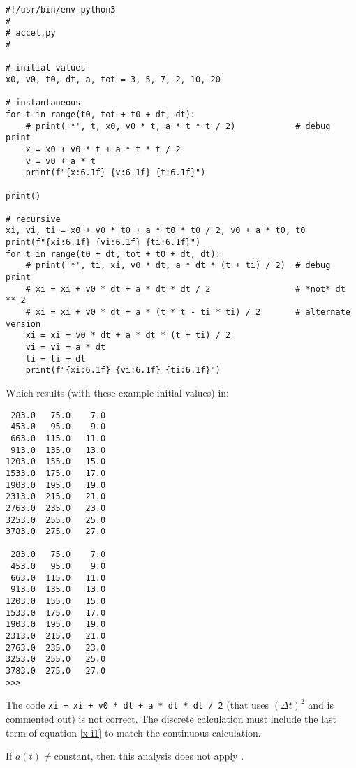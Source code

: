 \documentclass[10pt]{article}%
\begin{document}
\begin{multicols*}{2}
\divider


\begin{lstlisting}
#!/usr/bin/env python3
#
# accel.py
#

# initial values
x0, v0, t0, dt, a, tot = 3, 5, 7, 2, 10, 20

# instantaneous
for t in range(t0, tot + t0 + dt, dt):
    # print('*', t, x0, v0 * t, a * t * t / 2)            # debug print
    x = x0 + v0 * t + a * t * t / 2
    v = v0 + a * t
    print(f"{x:6.1f} {v:6.1f} {t:6.1f}")

print()

# recursive
xi, vi, ti = x0 + v0 * t0 + a * t0 * t0 / 2, v0 + a * t0, t0
print(f"{xi:6.1f} {vi:6.1f} {ti:6.1f}")
for t in range(t0 + dt, tot + t0 + dt, dt):
    # print('*', ti, xi, v0 * dt, a * dt * (t + ti) / 2)  # debug print
    # xi = xi + v0 * dt + a * dt * dt / 2                 # *not* dt ** 2
    # xi = xi + v0 * dt + a * (t * t - ti * ti) / 2       # alternate version
    xi = xi + v0 * dt + a * dt * (t + ti) / 2
    vi = vi + a * dt
    ti = ti + dt
    print(f"{xi:6.1f} {vi:6.1f} {ti:6.1f}")

\end{lstlisting}

Which results (with these example initial values) in:

\begin{lstlisting}
 283.0   75.0    7.0
 453.0   95.0    9.0
 663.0  115.0   11.0
 913.0  135.0   13.0
1203.0  155.0   15.0
1533.0  175.0   17.0
1903.0  195.0   19.0
2313.0  215.0   21.0
2763.0  235.0   23.0
3253.0  255.0   25.0
3783.0  275.0   27.0

 283.0   75.0    7.0
 453.0   95.0    9.0
 663.0  115.0   11.0
 913.0  135.0   13.0
1203.0  155.0   15.0
1533.0  175.0   17.0
1903.0  195.0   19.0
2313.0  215.0   21.0
2763.0  235.0   23.0
3253.0  255.0   25.0
3783.0  275.0   27.0
>>> 
\end{lstlisting}

The code \texttt{xi = xi + v0 * dt + a * dt * dt / 2} (that uses ${\left( \Delta t \right)}^{2}$ and is commented out) is not correct. The discrete calculation must include the last term of equation \eqref{x-i1} to match the continuous calculation.

If $a(t) \ne \text{constant}$, then this analysis does not apply .

\end{multicols*}
\end{document}
